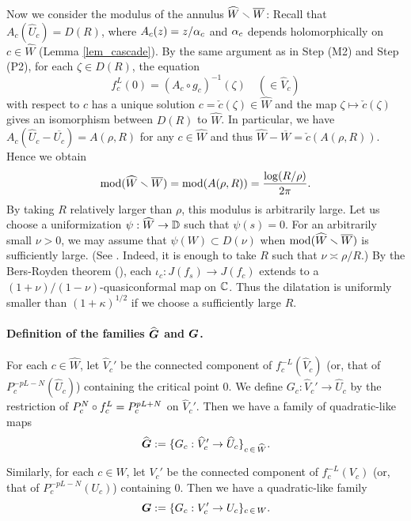 Now we consider the modulus of the annulus $\widehat{W} \smallsetminus \overline{W}$: 
Recall that $A_c(\widehat{U}_c)=D(R)$, where $A_c(z)=z/\alpha_c$
and $\alpha_c$ depends holomorphically on $c \in \widehat{W}$ 
(Lemma \ref{lem_cascade}).
By the same argument as in Step (M2) and Step (P2),
for each $\zeta \in D(R)$, the equation
$$
f_{c}^L(0) = (A_c \circ  g_c)^{-1}(\zeta) \quad (\in \widehat{V}_c)
$$ 
with respect to $c$ has a unique solution $c=\check{c}(\zeta) \in \widehat{W}$ and the map $\zeta \mapsto \check{c}(\zeta)$ gives an isomorphism between $D(R)$ to $\widehat{W}$.
In particular, we have $A_c(\widehat{U}_c-\overline{U_c})=A(\rho,R)$
for any $c \in \widehat{W}$ and thus $\widehat{W}-\overline{W}=\check{c}(A(\rho,R))$.
Hence we obtain
$$
\mathrm{mod}(\widehat{W} \smallsetminus \overline{W})
= \mathrm{mod}(A(\rho,R))=\frac{\log (R/\rho)}{2 \pi}.
$$
By taking $R$ relatively larger than $\rho$,
this modulus is arbitrarily large.
Let us choose a uniformization 
$\psi:\widehat{W} \to \mathbb D$
such that $\psi(s)=0$.
For an arbitrarily small $\nu>0$,
we may assume that $\psi(W) \subset D(\nu)$
when $\mathrm{mod}(\widehat{W} \smallsetminus \overline{W})$ 
is sufficiently large.
(See \cite[Theorems 2.1 and 2.4]{McMullen 1994}.
Indeed, it is enough to take $R$ such that $\nu \asymp \rho/R$.)
By the Bers-Royden theorem 
(\cite[Theorem 1]{Bers-Royden 1986}), 
each $\iota_c:J(f_s) \to J(f_c)$ extends to a 
$(1 + \nu)/(1 - \nu)$-quasiconformal map on $\mathbb C$.
Thus the dilatation is uniformly smaller than 
$(1+\kappa)^{1/2}$ if we choose a sufficiently large $R$.
\QED


\medskip 

\paragraph{\bf Definition of the families $\widehat{\boldsymbol{G}}$ 
and $\boldsymbol{G}$.} 
For each $c \in \widehat{W}$, 
let $\widehat{V}_c'$ be the connected component of 
$f_{c}^{-L}(\widehat{V}_{c})$ 
(or, that of $P_{c}^{-pL-N}(\widehat{U}_{c})$)
containing the critical point $0$. 
We define $G_c:\widehat{V}_c' \to  \widehat{U}_{c}$ 
by the restriction of $P_c^N \circ f_c^L = P_{c}^{pL+N}$ on $\widehat{V}_c'$. 
Then we have a family of quadratic-like maps 
$$
\widehat{\boldsymbol{G}}
:= \{G_c: \widehat{V}'_c \to \widehat{U}_c\}_{c  \,\in \, \widehat{W}}.
$$



Similarly, for each $c \in W$, 
let $V_c'$ be the connected component of 
$f_{c}^{-L}({V}_{c})$ 
(or, that of $P_{c}^{-pL-N}({U}_{c})$)
containing $0$.
Then we have a quadratic-like family 
$$
\boldsymbol{G}:= 
\{G_c: {V}_c' \to {U}_c\}_{c  \,\in \, W}.
$$


